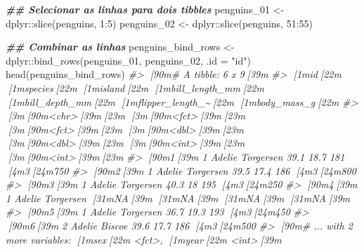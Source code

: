 \documentclass[
]{book}
\newenvironment{Shaded}{\begin{snugshade}}{\end{snugshade}}
\newcommand{\AttributeTok}[1]{\textcolor[rgb]{0.61,0.61,0.61}{#1}}
\newcommand{\CommentTok}[1]{\textcolor[rgb]{0.37,0.37,0.37}{\textit{#1}}}
\newcommand{\DecValTok}[1]{\textcolor[rgb]{0.06,0.06,0.06}{#1}}
\newcommand{\DocumentationTok}[1]{\textcolor[rgb]{0.37,0.37,0.37}{\textbf{\textit{#1}}}}
\newcommand{\FunctionTok}[1]{\textcolor[rgb]{0,0,0}{#1}}
\newcommand{\NormalTok}[1]{#1}
\newcommand{\OtherTok}[1]{\textcolor[rgb]{0.37,0.37,0.37}{#1}}
\newcommand{\SpecialCharTok}[1]{\textcolor[rgb]{0,0,0}{#1}}
\newcommand{\StringTok}[1]{\textcolor[rgb]{0.5,0.5,0.5}{#1}}
\begin{document}
\begin{Shaded}
\begin{Highlighting}[]
\DocumentationTok{\#\# Selecionar as linhas para dois tibbles}
\NormalTok{penguins\_01 }\OtherTok{\textless{}{-}}\NormalTok{ dplyr}\SpecialCharTok{::}\FunctionTok{slice}\NormalTok{(penguins, }\DecValTok{1}\SpecialCharTok{:}\DecValTok{5}\NormalTok{)}
\NormalTok{penguins\_02 }\OtherTok{\textless{}{-}}\NormalTok{ dplyr}\SpecialCharTok{::}\FunctionTok{slice}\NormalTok{(penguins, }\DecValTok{51}\SpecialCharTok{:}\DecValTok{55}\NormalTok{)}

\DocumentationTok{\#\# Combinar as linhas}
\NormalTok{penguins\_bind\_rows }\OtherTok{\textless{}{-}}\NormalTok{ dplyr}\SpecialCharTok{::}\FunctionTok{bind\_rows}\NormalTok{(penguins\_01, penguins\_02, }\AttributeTok{.id =} \StringTok{"id"}\NormalTok{)}
\FunctionTok{head}\NormalTok{(penguins\_bind\_rows)}
\CommentTok{\#\textgreater{} [90m\# A tibble: 6 x 9[39m}
\CommentTok{\#\textgreater{}   [1mid[22m    [1mspecies[22m [1misland[22m    [1mbill\_length\_mm[22m [1mbill\_depth\_mm[22m [1mflipper\_length\_\textasciitilde{}[22m [1mbody\_mass\_g[22m}
\CommentTok{\#\textgreater{}   [3m[90m\textless{}chr\textgreater{}[39m[23m [3m[90m\textless{}fct\textgreater{}[39m[23m   [3m[90m\textless{}fct\textgreater{}[39m[23m              [3m[90m\textless{}dbl\textgreater{}[39m[23m         [3m[90m\textless{}dbl\textgreater{}[39m[23m            [3m[90m\textless{}int\textgreater{}[39m[23m       [3m[90m\textless{}int\textgreater{}[39m[23m}
\CommentTok{\#\textgreater{} [90m1[39m 1     Adelie  Torgersen           39.1          18.7              181        [4m3[24m750}
\CommentTok{\#\textgreater{} [90m2[39m 1     Adelie  Torgersen           39.5          17.4              186        [4m3[24m800}
\CommentTok{\#\textgreater{} [90m3[39m 1     Adelie  Torgersen           40.3          18                195        [4m3[24m250}
\CommentTok{\#\textgreater{} [90m4[39m 1     Adelie  Torgersen           [31mNA[39m            [31mNA[39m                 [31mNA[39m          [31mNA[39m}
\CommentTok{\#\textgreater{} [90m5[39m 1     Adelie  Torgersen           36.7          19.3              193        [4m3[24m450}
\CommentTok{\#\textgreater{} [90m6[39m 2     Adelie  Biscoe              39.6          17.7              186        [4m3[24m500}
\CommentTok{\#\textgreater{} [90m\# ... with 2 more variables: [1msex[22m \textless{}fct\textgreater{}, [1myear[22m \textless{}int\textgreater{}[39m}


\end{Highlighting}
\end{Shaded}
\end{document}
